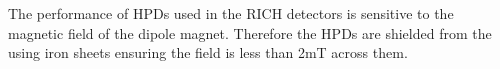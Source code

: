 The performance of HPDs used in the RICH detectors is sensitive to the magnetic field of the dipole magnet.
Therefore the HPDs are shielded from the using iron sheets ensuring the field is less than 2mT across them. %





 

